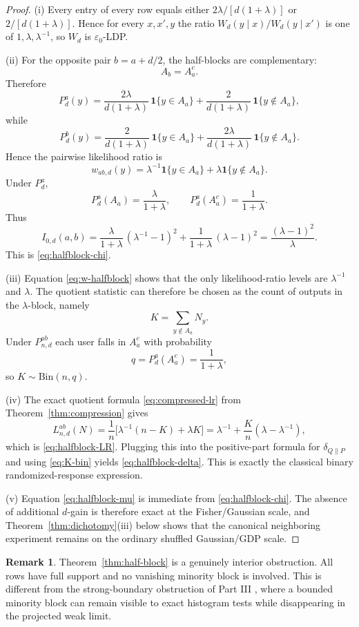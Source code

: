\documentclass[11pt]{amsart}
\numberwithin{equation}{section}
\theoremstyle{definition}
\newtheorem{remark}[theorem]{Remark}
\newcommand{\one}{\mathbf 1}
\newcommand{\Bin}{\mathrm{Bin}}
\begin{document}
\begin{proof}
(i)  Every entry of every row equals either
\(
2\lambda/[d(1+\lambda)]
\)
or
\(
2/[d(1+\lambda)]
\).
Hence for every $x,x',y$ the ratio
\(
W_d(y\mid x)/W_d(y\mid x')
\)
is one of
\(
1,\lambda,\lambda^{-1}
\),
so $W_d$ is $\varepsilon_0$-LDP.

(ii)  For the opposite pair $b=a+d/2$, the half-blocks are complementary:
\[
A_b=A_a^c.
\]
Therefore
\[
P_d^a(y)=
\frac{2\lambda}{d(1+\lambda)}\,\one\{y\in A_a\}
+
\frac{2}{d(1+\lambda)}\,\one\{y\notin A_a\},
\]
while
\[
P_d^b(y)=
\frac{2}{d(1+\lambda)}\,\one\{y\in A_a\}
+
\frac{2\lambda}{d(1+\lambda)}\,\one\{y\notin A_a\}.
\]
Hence the pairwise likelihood ratio is
\[
w_{ab,d}(y)
=
\lambda^{-1}\one\{y\in A_a\}
+
\lambda\one\{y\notin A_a\}. \tag{5.7}\label{eq:w-halfblock}
\]
Under $P_d^a$,
\[
P_d^a(A_a)=\frac{\lambda}{1+\lambda},
\qquad
P_d^a(A_a^c)=\frac{1}{1+\lambda}.
\]
Thus
\[
I_{0,d}(a,b)
=
\frac{\lambda}{1+\lambda}\,(\lambda^{-1}-1)^2
+
\frac{1}{1+\lambda}\,(\lambda-1)^2
=
\frac{(\lambda-1)^2}{\lambda}.
\]
This is \eqref{eq:halfblock-chi}.

(iii)  Equation \eqref{eq:w-halfblock} shows that the only likelihood-ratio levels are
$\lambda^{-1}$ and $\lambda$.
The quotient statistic can therefore be chosen as the count of outputs in the $\lambda$-block,
namely
\[
K=\sum_{y\notin A_a}N_y.
\]
Under $P_{n,d}^{ab}$ each user falls in $A_a^c$ with probability
\[
q=P_d^a(A_a^c)=\frac{1}{1+\lambda},
\]
so $K\sim \Bin(n,q)$.

(iv)  The exact quotient formula \eqref{eq:compressed-lr} from
Theorem~\ref{thm:compression} gives
\[
L_{n,d}^{ab}(N)
=
\frac{1}{n}\bigl[\lambda^{-1}(n-K)+\lambda K\bigr]
=
\lambda^{-1}+\frac{K}{n}(\lambda-\lambda^{-1}),
\]
which is \eqref{eq:halfblock-LR}.  Plugging this into the positive-part formula for
\(
\delta_{Q\|P}
\)
and using \eqref{eq:K-bin} yields \eqref{eq:halfblock-delta}.  This is exactly the classical binary
randomized-response expression.

(v)  Equation \eqref{eq:halfblock-mu} is immediate from \eqref{eq:halfblock-chi}.
The absence of additional $d$-gain is therefore exact at the Fisher/Gaussian scale, and
Theorem~\ref{thm:dichotomy}(iii) below shows that the canonical neighboring experiment remains on the
ordinary shuffled Gaussian/GDP scale.
\end{proof}

\begin{remark}
Theorem~\ref{thm:half-block} is a genuinely interior obstruction.
All rows have full support and no vanishing minority block is involved.
This is different from the strong-boundary obstruction of Part III
\cite[Prop.~6.1]{ShvetsPartIII}, where a bounded minority block can remain visible to exact histogram tests
while disappearing in the projected weak limit.
\end{remark}
\end{document}
